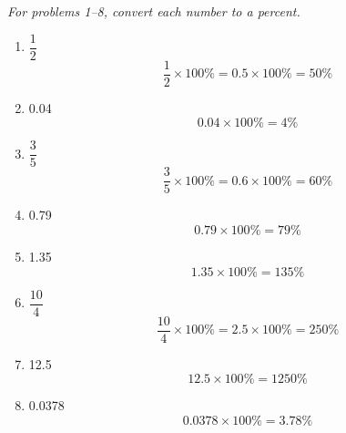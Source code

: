 \emph{For problems 1--8, convert each number to a percent.}
\begin{enumerate}
\item $\dfrac{1}{2}$ 
\[\dfrac{1}{2} \times 100\% = 0.5 \times 100\% = 50\%\]

\item 0.04 
\[0.04 \times 100\% = 4\%\]

\item $\dfrac{3}{5}$ 
\[\dfrac{3}{5} \times 100\% = 0.6 \times 100\% = 60\%\]

\item 0.79 
\[0.79 \times 100\% = 79\%\]

\item 1.35 
\[1.35 \times 100\% = 135\%\]

\item $\dfrac{10}{4}$ 
\[\dfrac{10}{4} \times 100\% = 2.5 \times 100\% = 250\%\]

\item 12.5 
\[12.5 \times 100\% = 1250\%\]

\item 0.0378 
\[0.0378 \times 100\% = 3.78\%\]
\end{enumerate}

